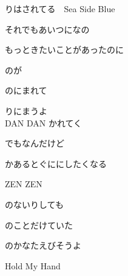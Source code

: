{りはされてる　Sea Side Blue

それでもあいつになの

もっときたいことがあったのに　

のが

のにまれて　

りにまうよ
\\

DAN DAN かれてく　

でもなんだけど

かあるとぐににしたくなる

ZEN ZEN　

のないりしても

のことだけていた

のかなたえびそうよ　

Hold My Hand

}